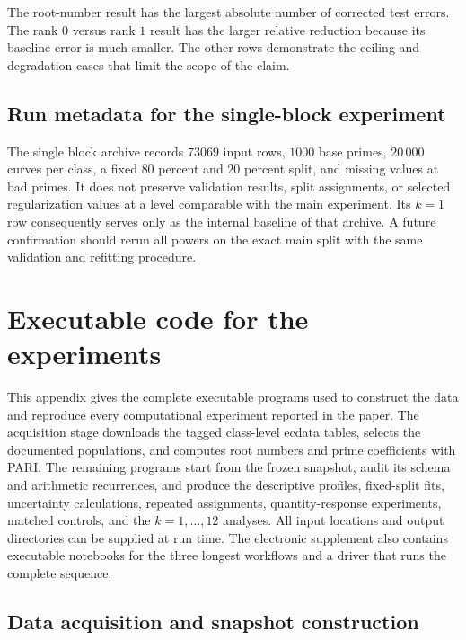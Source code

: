 \documentclass[12pt,reqno]{amsart}
\numberwithin{equation}{section}
\theoremstyle{plain}
\theoremstyle{definition}
\theoremstyle{remark}
\begin{document}
The root-number result has the largest absolute number of corrected test errors.
The rank $0$ versus rank $1$ result has the larger
relative reduction because its baseline error is much smaller.
The other rows demonstrate the ceiling and degradation cases that limit the scope of the claim.

\subsection{Run metadata for the single-block experiment}

The single block archive records $73069$ input rows, $1000$ base primes, $20\,000$ curves per class, a fixed $80$ percent and $20$ percent split, and missing values at bad primes.
It does not preserve validation results, split assignments, or selected regularization values at a level comparable with the main experiment.
Its $k=1$ row consequently serves only as the internal baseline of that archive.
A future confirmation should rerun all powers on the exact main split with the same validation and refitting procedure.

\clearpage
\section{Executable code for the experiments}
\label{appCode}

This appendix gives the complete executable programs used to construct the data and reproduce every computational experiment reported in the paper.
The acquisition stage downloads the tagged class-level ecdata tables, selects the documented populations, and computes root numbers and prime coefficients with PARI.
The remaining programs start from the frozen snapshot, audit its schema and arithmetic recurrences, and produce the descriptive profiles, fixed-split fits, uncertainty calculations, repeated assignments, quantity-response experiments, matched controls, and the $k=1,\ldots,12$ analyses.
All input locations and output directories can be supplied at run time.
The electronic supplement also contains executable notebooks for the three longest workflows and a driver that runs the complete sequence.

\subsection{Data acquisition and snapshot construction}\mbox{}\par\smallskip
\end{document}
